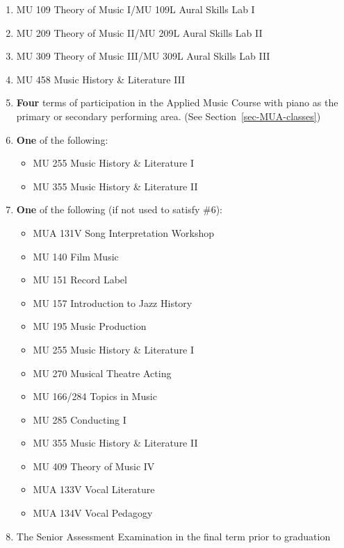 \documentclass[
  letterpaper,
]{scrbook}
\providecommand{\tightlist}{%
  \setlength{\itemsep}{0pt}\setlength{\parskip}{0pt}}
\begin{document}
\begin{enumerate}
\def\labelenumi{\arabic{enumi}.}
\tightlist
\item
  MU 109 Theory of Music I/MU 109L Aural Skills Lab I
\item
  MU 209 Theory of Music II/MU 209L Aural Skills Lab II
\item
  MU 309 Theory of Music III/MU 309L Aural Skills Lab III
\item
  MU 458 Music History \& Literature III
\item
  \textbf{Four} terms of participation in the Applied Music Course with
  piano as the primary or secondary performing area. (See
  Section~\ref{sec-MUA-classes})
\item
  \textbf{One} of the following:

  \begin{itemize}
  \tightlist
  \item
    MU 255 Music History \& Literature I
  \item
    MU 355 Music History \& Literature II
  \end{itemize}
\item
  \textbf{One} of the following (if not used to satisfy \#6):

  \begin{itemize}
  \tightlist
  \item
    MUA 131V Song Interpretation Workshop
  \item
    MU 140 Film Music
  \item
    MU 151 Record Label
  \item
    MU 157 Introduction to Jazz History
  \item
    MU 195 Music Production
  \item
    MU 255 Music History \& Literature I
  \item
    MU 270 Musical Theatre Acting
  \item
    MU 166/284 Topics in Music
  \item
    MU 285 Conducting I
  \item
    MU 355 Music History \& Literature II
  \item
    MU 409 Theory of Music IV
  \item
    MUA 133V Vocal Literature
  \item
    MUA 134V Vocal Pedagogy
  \end{itemize}
\item
  The Senior Assessment Examination in the final term prior to
  graduation
\end{enumerate}
\end{document}
